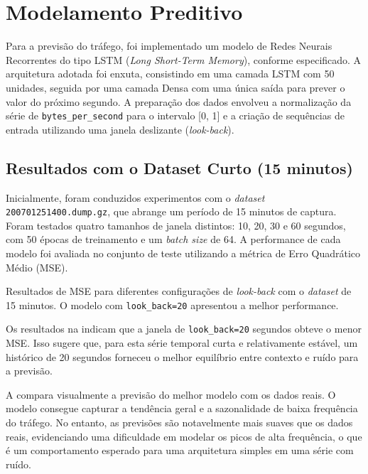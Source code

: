 \section{Modelamento Preditivo}

Para a previsão do tráfego, foi implementado um modelo de Redes Neurais Recorrentes do tipo LSTM (\emph{Long
Short-Term Memory}), conforme especificado. A arquitetura adotada foi enxuta, consistindo em uma camada LSTM
com 50 unidades, seguida por uma camada Densa com uma única saída para prever o valor do próximo segundo. A
preparação dos dados envolveu a normalização da série de \texttt{bytes\_per\_second} para o intervalo [0, 1]
e a criação de sequências de entrada utilizando uma janela deslizante (\emph{look-back}).

\subsection{Resultados com o Dataset Curto (15 minutos)}

Inicialmente, foram conduzidos experimentos com o \emph{dataset} \texttt{200701251400.dump.gz}, que abrange
um período de 15 minutos de captura. Foram testados quatro tamanhos de janela distintos: 10, 20, 30 e 60
segundos, com 50 épocas de treinamento e um \emph{batch size} de 64. A performance de cada modelo foi
avaliada no conjunto de teste utilizando a métrica de Erro Quadrático Médio (MSE).

\begin{table}[!htb]
    \centering
    \caption{Resultados de MSE para diferentes configurações de \emph{look-back} com o \emph{dataset} de 15
    minutos. O modelo com \texttt{look\_back=20} apresentou a melhor performance.}
    \label{tab:modeling-mse-short}
    
\end{table}

Os resultados na  indicam que a janela de \texttt{look\_back=20} segundos obteve
o menor MSE. Isso sugere que, para esta série temporal curta e relativamente estável, um histórico de 20
segundos forneceu o melhor equilíbrio entre contexto e ruído para a previsão.

A  compara visualmente a previsão do melhor modelo com os dados reais. O
modelo consegue capturar a tendência geral e a sazonalidade de baixa frequência do tráfego. No entanto, as
previsões são notavelmente mais suaves que os dados reais, evidenciando uma dificuldade em modelar os picos
de alta frequência, o que é um comportamento esperado para uma arquitetura simples em uma série com ruído.

